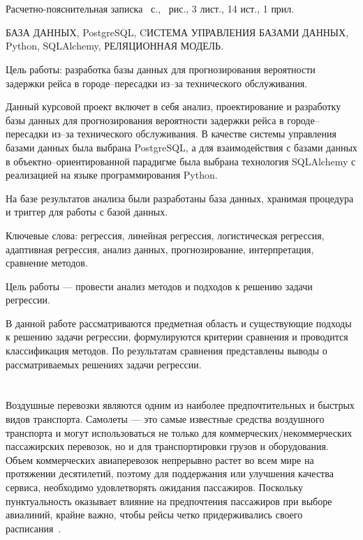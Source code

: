 \chapter*{}

Расчетно-пояснительная записка~\pageref{LastPage} с., \totalfigures\ рис., 3 лист., 14 ист., 1 прил.

БАЗА ДАННЫХ, PostgreSQL, CИСТЕМА УПРАВЛЕНИЯ БАЗАМИ ДАННЫХ, Python, SQLAlchemy, РЕЛЯЦИОННАЯ МОДЕЛЬ.

Цель работы: разработка базы данных для прогнозирования вероятности задержки рейса в городе--пересадки из--за технического обслуживания.

Данный курсовой проект включет в себя анализ, проектирование и разработку
базы данных для прогнозирования вероятности задержки рейса в городе--пересадки из--за технического обслуживания.
В качестве системы управления базами данных была выбрана PostgreSQL, а для взаимодействия с базами данных в объектно--ориентированной парадигме была выбрана технология SQLAlchemy с реализацией на языке программирования Python.

На базе результатов анализа были разработаны база данных, хранимая процедура и триггер для работы с базой данных.

\begin{essay}{}
    Ключевые слова: регрессия, линейная регрессия, логистическая регрессия, адаптивная регрессия, анализ данных, прогнозирование, интерпретация, сравнение методов.

    Цель работы --- провести анализ методов и подходов к решению задачи регрессии.

    В данной работе рассматриваются предметная область и существующие подходы к решению задачи регрессии, формулируются критерии сравнения и проводится классификация методов.
    По результатам сравнения представлены выводы о рассматриваемых решениях задачи регрессии.
\end{essay}

\newpage
{}
\chapter*{}

Воздушные перевозки являются одним из наиболее предпочтительных и быстрых видов транспорта.
Самолеты --- это самые известные средства воздушного транспорта и могут использоваться не только для коммерческих/некоммерческих пассажирских перевозок, но и для транспортировки грузов и оборудования.
Объем коммерческих авиаперевозок непрерывно растет во всем мире на протяжении десятилетий, поэтому для поддержания или улучшения качества сервиса, необходимо удовлетворять ожидания пассажиров.
Поскольку пунктуальность оказывает влияние на предпочтения пассажиров при выборе авиалиний, крайне важно, чтобы рейсы четко придерживались своего расписания~\cite{tat}.

